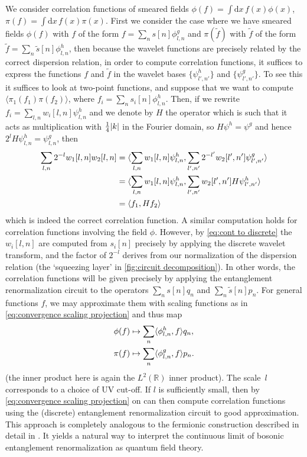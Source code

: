 \documentclass[submission, Phys]{SciPost}
\theoremstyle{definition}
\theoremstyle{remark}
\DeclarePairedDelimiter{\abs}{\lvert}{\rvert}
\DeclarePairedDelimiter{\braket}{\langle}{\rangle}
\newcommand{\RR}{\mathbb R}
\renewcommand{\d}{\ensuremath{\mathrm{d}}}
\newcommand{\change}[1]{#1}
\begin{document}
We consider correlation functions of smeared fields $\phi(f) = \int \d x\, f(x) \phi(x)$, $\pi(f) = \int \d x\, f(x) \pi(x)$.
\change{First we consider the case where we have smeared fields $\phi(f)$ with $f$ of the form $f = \sum_{n} s[n] \phi^{g}_{l,n}$ and $\pi(\tilde{f})$ with $\tilde{f}$ of the form $\tilde{f} = \sum_{n} \tilde{s}[n] \phi^{h}_{l,n}$, then because the wavelet functions are precisely related by the correct dispersion relation, in order to compute correlation functions, it suffices to express the functions $f$ and $\tilde{f}$ in the wavelet bases $\{\psi^{h}_{l',n'}\}$ and $\{\psi^{g}_{l',n'}\}$.
To see this it suffices to look at two-point functions, and suppose that we want to compute $\langle \pi_1(f_1)\pi(f_2)\rangle$, where $f_i = \sum_{n} s_i[n] \phi^{h}_{l,n}$.
Then, if we rewrite $f_i = \sum_{l,n} w_i[l,n] \psi^{h}_{l,n}$ and we denote by $H$ the operator which is such that it acts as multiplication with $\frac{1}{4}\abs{k}$ in the Fourier domain, so $H \psi^{h} = \psi^{g}$ and hence $2^l H \psi^{h}_{l,n} = \psi^{g}_{l,n}$, then
\begin{align*}
  \sum_{l,n} 2^{-l} w_1[l,n]w_2[l,n] &= \braket{\sum_{l,n} w_1[l,n] \psi^{h}_{l,n}, \sum_{l',n'} 2^{-l'} w_2[l',n'] \psi^{g}_{l',n'}}\\
  &= \braket{\sum_{l,n} w_1[l,n] \psi^{h}_{l,n}, \sum_{l',n'} w_2[l',n'] H \psi^{h}_{l',n'}}\\
  &= \braket{f_1, Hf_2}
\end{align*}
which is indeed the correct correlation function.
A similar computation holds for correlation functions involving the field $\phi$.
However, by \cref{eq:cont to discrete} the $w_i[l,n]$ are computed from $s_i[n]$ precisely by applying the discrete wavelet transform, and the factor of $2^{-l}$ derives from our normalization of the dispersion relation (the `squeezing layer' in \cref{fig:circuit decomposition}).
In other words, the correlation functions will be given precisely by applying the entanglement renormalization circuit to the operators $\sum_n s[n] q_n$ and $\sum_n \tilde{s}[n] p_n$.
For general functions $f$, we may approximate them with scaling functions as in \cref{eq:convergence scaling projection} and thus map
\begin{equation}\begin{aligned}\label{eq:discretize}
  \phi(f) &\mapsto \sum_n \braket{\phi^{h}_{l,n}, f} q_n, \\
  \pi(f) &\mapsto \sum_n \braket{\phi^{g}_{l,n}, f} p_n.
\end{aligned}\end{equation}
(the inner product here is again the $L^2(\RR)$ inner product).
The scale~$l$ corresponds to a choice of UV cut-off.
If $l$ is sufficiently small, then by \cref{eq:convergence scaling projection} on can then compute correlation functions using the (discrete) entanglement renormalization circuit to good approximation.}
This approach is completely analogous to the fermionic construction described in detail in \cite{witteveen2019quantum}.
It yields a natural way to interpret the continuous limit of bosonic entanglement renormalization as quantum field theory.
\end{document}
